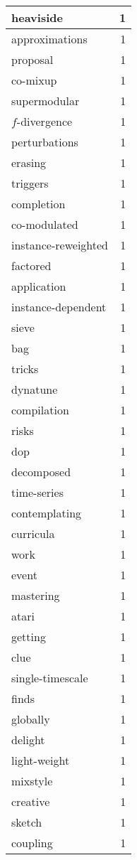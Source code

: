 \begin{table}[h]
\begin{tabular}{|l|r|}
\hline
heaviside & 1 \\
\hline
approximations & 1 \\
\hline
proposal & 1 \\
\hline
co-mixup & 1 \\
\hline
supermodular & 1 \\
\hline
$f$-divergence & 1 \\
\hline
perturbations & 1 \\
\hline
erasing & 1 \\
\hline
triggers & 1 \\
\hline
completion & 1 \\
\hline
co-modulated & 1 \\
\hline
instance-reweighted & 1 \\
\hline
factored & 1 \\
\hline
application & 1 \\
\hline
instance-dependent & 1 \\
\hline
sieve & 1 \\
\hline
bag & 1 \\
\hline
tricks & 1 \\
\hline
dynatune & 1 \\
\hline
compilation & 1 \\
\hline
risks & 1 \\
\hline
dop & 1 \\
\hline
decomposed & 1 \\
\hline
time-series & 1 \\
\hline
contemplating & 1 \\
\hline
curricula & 1 \\
\hline
work & 1 \\
\hline
event & 1 \\
\hline
mastering & 1 \\
\hline
atari & 1 \\
\hline
getting & 1 \\
\hline
clue & 1 \\
\hline
single-timescale & 1 \\
\hline
finds & 1 \\
\hline
globally & 1 \\
\hline
delight & 1 \\
\hline
light-weight & 1 \\
\hline
mixstyle & 1 \\
\hline
creative & 1 \\
\hline
sketch & 1 \\
\hline
coupling & 1 \\

\end{tabular}
\end{table}

